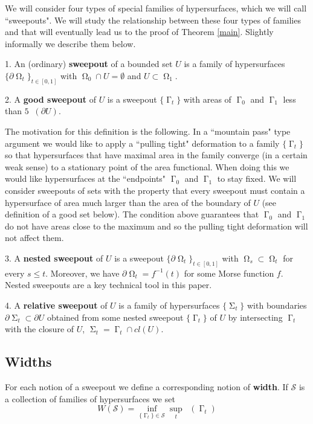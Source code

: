 \documentclass[12pt]{amsart}
\DeclareMathOperator{\Hn}{\mathcal{H}^n}
\DeclareMathOperator{\G}{\Gamma}
\DeclareMathOperator{\Om}{\Omega}
\DeclareMathOperator{\Si}{\Sigma}
\newcommand{\Cgs}{5 \Hn(\partial U)}
\theoremstyle{definition}
\begin{document}
We will consider four types of special families of
hypersurfaces, which we will call ``sweepouts".
We will study the relationship between these four types of
families and that will eventually lead us to the proof of
Theorem \ref*{main}.
Slightly informally we describe them below.

1. An (ordinary) \textbf{sweepout} of a bounded set $U$
is a family of hypersurfaces $\{ \partial \Om_t \}_{t \in [0,1]}$
with $\Om_0 \cap U = \emptyset$ and $U \subset \Om_1$.


2. A \textbf{good sweepout} of $U$ is a sweepout $\{\G_t\}$ with
areas of $\G_0$ and $\G_1$ less than $\Cgs$.

The motivation for this definition is the following. 
In a ``mountain pass" type argument
we would like to apply a ``pulling tight" deformation 
to a family $\{ \G_t \}$
so that hypersurfaces that have maximal area in the family
converge (in a certain weak sense) to a stationary point
of the area functional.
When doing this we would like hypersurfaces at the ``endpoints"
$\G_0$ and $\G_1$ to stay fixed.
We will consider sweepouts of sets with
the property that every sweepout must contain
a hypersurface of area much larger than 
the area of the boundary of $U$
(see definition of a good set below).
The condition above guarantees that
$\G_0$ and $\G_1$ do not have areas close to the maximum
and so the pulling tight deformation will not affect them.


3. A \textbf{nested sweepout} of $U$ is a sweepout 
$\{ \partial \Om_t \}_{t \in [0,1]}$ with
$\Om_s \subset \Om_t$ for every $s \leq t$.
Moreover, we have $\partial \Om_t = f^{-1}(t)$
for some Morse function $f$.
Nested sweepouts are a key technical tool
in this paper.

4. A \textbf{relative sweepout} of $U$ is a family of 
hypersurfaces $\{ \Si_t \}$ with boundaries $\partial  \Si_t \subset \partial U$
obtained from some nested sweepout $\{\G_t \}$ of $U$ 
by intersecting 
$\G_t$ with the closure of $U$, $\Si_t = \G_t \cap cl(U)$.



\subsection{Widths}
For each notion of a sweepout we define a corresponding notion of \textbf{width}.
If $\mathcal{S}$ is a collection of families of hypersurfaces we set
$$W(\mathcal{S}) = \inf_{\{\G_t \} \in \mathcal{S}} \sup_t \Hn (\G_t)$$
\end{document}
